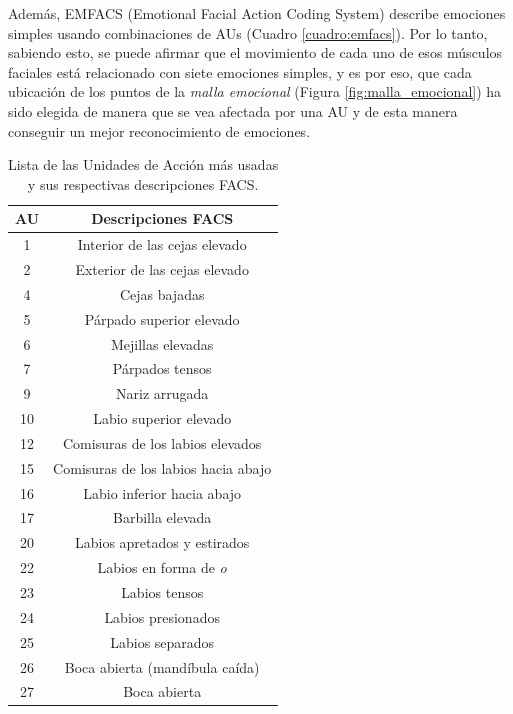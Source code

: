 Además, EMFACS (Emotional Facial Action Coding System) describe emociones simples usando combinaciones de AUs (Cuadro \ref{cuadro:emfacs}). Por lo tanto, sabiendo esto, se puede afirmar que el movimiento de cada uno de esos músculos faciales está relacionado con siete emociones simples, y es por eso, que cada ubicación de los puntos de la \textit{malla emocional} (Figura \ref{fig:malla_emocional}) ha sido elegida de manera que se vea afectada por una AU y de esta manera conseguir un mejor reconocimiento de emociones.\\

\begin{table}[H]
\begin{center}
\begin{tabular}{|c|c|}
     \hline
    \textbf{AU} & \textbf{Descripciones FACS} \\
    \hline
     1 & Interior de las cejas elevado\\ 
     2 & Exterior de las cejas elevado \\ 
     4 & Cejas bajadas \\
     5 & Párpado superior elevado\\
     6 & Mejillas elevadas \\ 
     7 & Párpados tensos \\
     9 & Nariz arrugada \\
     10 & Labio superior elevado \\
     12 & Comisuras de los labios elevados \\ 
     15 & Comisuras de los labios hacia abajo \\
     16 & Labio inferior hacia abajo \\
     17 & Barbilla elevada \\
     20 & Labios apretados y estirados\\
     22 & Labios en forma de \textit{o} \\
     23 & Labios tensos \\
     24 & Labios presionados \\
     25 & Labios separados \\
     26 & Boca abierta (mandíbula caída)\\
     27 & Boca abierta \\
     \hline
 \end{tabular}
 \captionsetup{justification=centering}
\caption{Lista de las Unidades de Acción más usadas y sus respectivas descripciones FACS.}
\label{cuadro:au}
\end{center}
\end{table}

